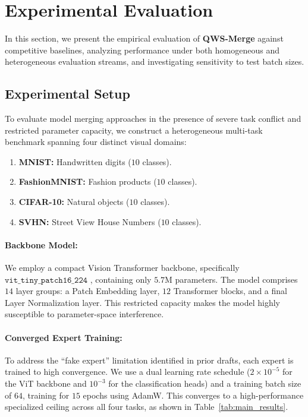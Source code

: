 \section{Experimental Evaluation}
\label{sec:experiments}

In this section, we present the empirical evaluation of \textbf{QWS-Merge} against competitive baselines, analyzing performance under both homogeneous and heterogeneous evaluation streams, and investigating sensitivity to test batch sizes.

\subsection{Experimental Setup}
\label{subsec:setup}
To evaluate model merging approaches in the presence of severe task conflict and restricted parameter capacity, we construct a heterogeneous multi-task benchmark spanning four distinct visual domains:
\begin{enumerate}
    \item \textbf{MNIST:} Handwritten digits ($10$ classes).
    \item \textbf{FashionMNIST:} Fashion products ($10$ classes).
    \item \textbf{CIFAR-10:} Natural objects ($10$ classes).
    \item \textbf{SVHN:} Street View House Numbers ($10$ classes).
\end{enumerate}

\paragraph{Backbone Model:} We employ a compact Vision Transformer backbone, specifically $\mathtt{vit\_tiny\_patch16\_224}$ \cite{dosovitskiy2020image}, containing only $5.7$M parameters. The model comprises $14$ layer groups: a Patch Embedding layer, $12$ Transformer blocks, and a final Layer Normalization layer. This restricted capacity makes the model highly susceptible to parameter-space interference.

\paragraph{Converged Expert Training:} To address the ``fake expert'' limitation identified in prior drafts, each expert is trained to high convergence. We use a dual learning rate schedule ($2 \times 10^{-5}$ for the ViT backbone and $10^{-3}$ for the classification heads) and a training batch size of $64$, training for $15$ epochs using AdamW. This converges to a high-performance specialized ceiling across all four tasks, as shown in Table~\ref{tab:main_results}.

